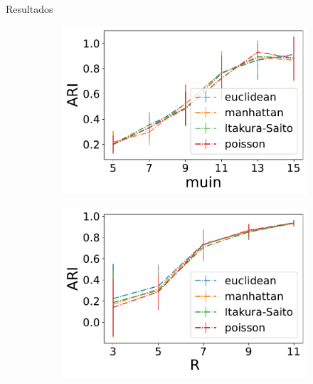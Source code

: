 \documentclass[aspectratio=169]{beamer}
\begin{document}
\begin{frame}{Resultados}
	
	


	\begin{figure}[!ht]
		\centering
		\begin{subfigure}[b]{0.3\textwidth}
			\includegraphics[width=\textwidth]{img/varyingNetworkDivergence_Poisson_Gaussian_N_400_K_4_pin_0,04_pout_0,01_muout_5_r_2_nAverage_20.pdf}
			\label{fig:varying_divergences_network}
		\end{subfigure}
		\hspace*{20px}
		\begin{subfigure}[b]{0.3\textwidth}
			\includegraphics[width=\textwidth]{img/varyingAttributeDivergence_netGaussian_attPoisson_N_200_K_2_pin_0,04_pout_0,01_muin_2_muout_0_nu2_3_nAverage_20.pdf}

\end{subfigure}
\end{figure}
\end{frame}
\end{document}
